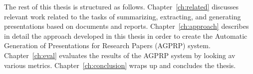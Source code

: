 The rest of this thesis is structured as follows. Chapter~\ref{ch:related} discusses relevant work related to the tasks of summarizing, extracting, and generating presentations based on documents and reports. Chapter~\ref{ch:approach} describes in detail the approach developed in this thesis in order to create the Automatic Generation of Presentations for Research Papers (AGPRP) system. Chapter~\ref{ch:eval} evaluates the results of the AGPRP system by looking av various metrics. Chapter~\ref{ch:conclusion} wraps up and concludes the thesis.